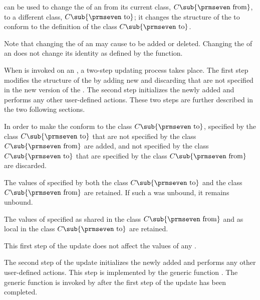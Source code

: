               
 can be used to change the  
of an  from its current class, $C\sub {\hbox{{\prmseven from}}}$,
to a different class, $C\sub {\hbox{{\prmseven to}}}$; it changes the
structure of the  to conform to the definition of the class
$C\sub {\hbox{{\prmseven to}}}$.

Note that changing the  of an  may cause
 to be added or deleted.  Changing the  of an
 does not change its identity as defined by the
 function.
      
When  is invoked on an , a two-step
updating process takes place.  The first step modifies the structure of
the  by adding new  and discarding 
 that are not specified in the new version of the .
The second step initializes the newly added  and performs 
any other user-defined actions. These two steps are further described in the 
two following sections.


In order to make the  conform to the class $C\sub
{\hbox{{\prmseven to}}}$,  specified by the class $C\sub
{\hbox{{\prmseven to}}}$ that are not specified by the class $C\sub
{\hbox{{\prmseven from}}}$ are added, and  not specified by
the class $C\sub {\hbox{{\prmseven to}}}$ that are specified by the
class $C\sub {\hbox{{\prmseven from}}}$ are discarded.

The values of  specified by both the class $C\sub
{\hbox{{\prmseven to}}}$ and the class $C\sub {\hbox{{\prmseven
from}}}$ are retained. If such a  was unbound, it remains
unbound.

The values of  specified as shared in the class $C\sub
{\hbox{{\prmseven from}}}$ and as local in the class $C\sub
{\hbox{{\prmseven to}}}$ are retained.

This first step of the update does not affect the values of any 
.

\endsubsection%


The second step of the update initializes the newly added  and
performs any other user-defined actions.  This step is implemented by
the generic function .  The
generic function  is invoked
by  after the first step of the update has been
completed.

